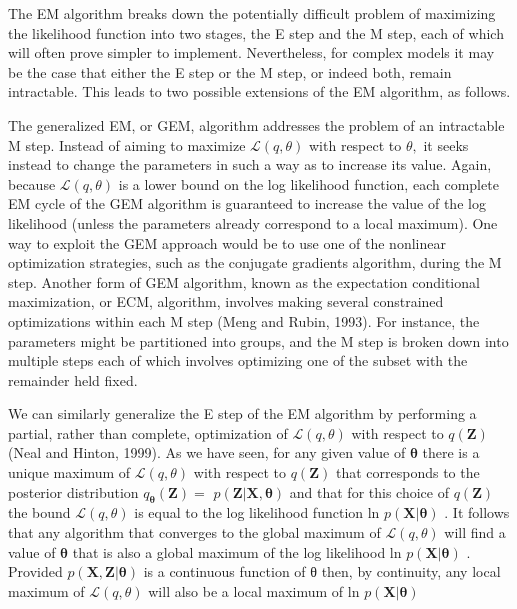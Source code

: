 \documentclass[
  10
]{article}
\begin{document}
The EM algorithm breaks down the potentially difficult problem of
maximizing the likelihood function into two stages, the E step and the M
step, each of which will often prove simpler to implement. Nevertheless,
for complex models it may be the case that either the E step or the M
step, or indeed both, remain intractable. This leads to two possible
extensions of the EM algorithm, as follows.

The generalized EM, or GEM, algorithm addresses the problem of an
intractable M step. Instead of aiming to maximize
\(\mathcal { L } ( q , \theta )\) with respect to \(\theta ,\) it seeks
instead to change the parameters in such a way as to increase its value.
Again, because \(\mathcal { L } ( q , \theta )\) is a lower bound on the
log likelihood function, each complete EM cycle of the GEM algorithm is
guaranteed to increase the value of the log likelihood (unless the
parameters already correspond to a local maximum). One way to exploit
the GEM approach would be to use one of the nonlinear optimization
strategies, such as the conjugate gradients algorithm, during the M
step. Another form of GEM algorithm, known as the expectation
conditional maximization, or ECM, algorithm, involves making several
constrained optimizations within each M step (Meng and Rubin, 1993). For
instance, the parameters might be partitioned into groups, and the M
step is broken down into multiple steps each of which involves
optimizing one of the subset with the remainder held fixed.

We can similarly generalize the E step of the EM algorithm by performing
a partial, rather than complete, optimization of
\(\mathcal { L } ( q , \theta )\) with respect to
\(q ( \mathbf { Z } )\) (Neal and Hinton, 1999). As we have seen, for
any given value of \(\pmb \theta\) there is a unique maximum of
\(\mathcal { L } ( q , \theta )\) with respect to
\(q ( \mathbf { Z } )\) that corresponds to the posterior distribution
\(q _ { \pmb { \theta } } ( \mathbf { Z } ) =\)
\(p ( \mathbf { Z } | \mathbf { X } , \pmb \theta )\) and that for this
choice of \(q ( \mathbf { Z } )\) the bound
\(\mathcal { L } ( q , \theta )\) is equal to the log likelihood
function ln \(p ( \mathbf { X } | \pmb { \theta } )\) . It follows that
any algorithm that converges to the global maximum of
\(\mathcal { L } ( q , \theta )\) will find a value of \(\pmb \theta\)
that is also a global maximum of the log likelihood ln
\(p ( \mathbf { X } | \pmb { \theta } )\) . Provided
\(p ( \mathbf { X } , \mathbf { Z } | \boldsymbol { \theta } )\) is a
continuous function of θ then, by continuity, any local maximum of
\(\mathcal { L } ( q , \theta )\) will also be a local maximum of ln
\(p ( \mathbf { X } | \pmb { \theta } )\)
\end{document}
